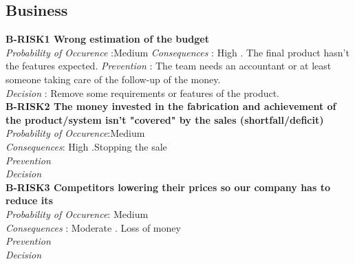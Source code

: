 



\subsection{Business}


	\textbf{ B-RISK1 Wrong estimation of the budget} \\
	\textit{Probability of Occurence} :Medium
	\textit{Consequences} : High . The final product hasn't the features expected.
	\textit{Prevention} : The team needs an accountant or at least someone taking care of the follow-up of the money. \\
	\textit{Decision} : Remove some requirements or features of the product. \\
	
	
	\textbf{ B-RISK2 The money invested in the fabrication and achievement of the product/system isn't "covered" by the sales (shortfall/deficit)} \\
	\textit{Probability of Occurence}:Medium \\
	\textit{Consequences}: High .Stopping the sale \\
	\textit{Prevention} \\
	\textit{Decision} \\
	
	\textbf{ B-RISK3 Competitors lowering their prices so our company has to reduce its} \\
	\textit{Probability of Occurence}: Medium \\
	\textit{Consequences} : Moderate . Loss of money \\
	\textit{Prevention} \\
	\textit{Decision} \\
	
